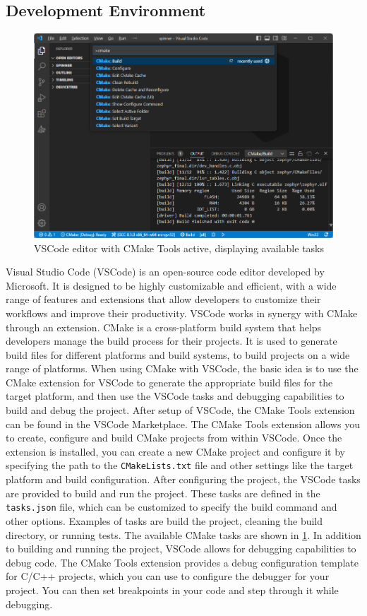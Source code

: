 \subsection{Development Environment}
\begin{figure}[htbp]
	\centering
	\includegraphics[width=.8\textwidth]{Figures/3_cmake_vscode.png}
	\caption[VSCode editor with CMake Tools active]{VSCode editor with CMake Tools active, displaying available tasks}
	\label{fig:3_vscode_cmake_build}
\end{figure}

Visual Studio Code (VSCode) is an \gls{open-source} code editor developed by Microsoft. It is designed to be highly customizable and efficient, with a wide range of features and extensions that allow developers to customize their workflows and improve their productivity. VSCode works in synergy with CMake through an extension. CMake is a cross-platform build system that helps developers manage the build process for their projects. It is used to generate build files for different platforms and build systems, to build projects on a wide range of platforms. When using CMake with VSCode, the basic idea is to use the CMake extension for VSCode to generate the appropriate build files for the target platform, and then use the VSCode tasks and debugging capabilities to build and debug the project. After setup of VSCode, the CMake Tools\cite{cmake} extension can be found in the VSCode Marketplace. The CMake Tools extension allows you to create, configure and build CMake projects from within VSCode. Once the extension is installed, you can create a new CMake project and configure it by specifying the path to the \texttt{CMakeLists.txt} file and other settings like the target platform and build configuration. After configuring the project, the VSCode tasks are provided to build and run the project. These tasks are defined in the \texttt{tasks.json} file, which can be customized to specify the build command and other options. Examples of tasks are build the project, cleaning the build directory, or running tests. The available CMake tasks are shown in \cref{fig:3_vscode_cmake_build}. In addition to building and running the project, VSCode allows for debugging capabilities to debug code. The CMake Tools extension provides a debug configuration template for C/C++ projects, which you can use to configure the debugger for your project. You can then set breakpoints in your code and step through it while debugging.


